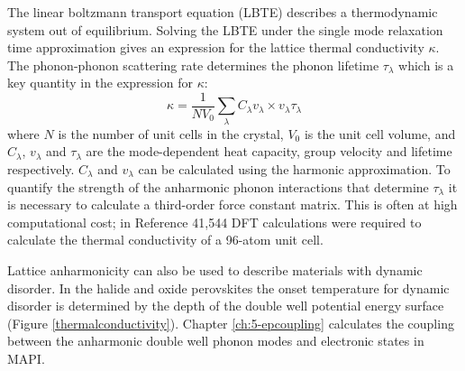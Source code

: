 The linear boltzmann transport equation (LBTE) describes a thermodynamic system out of equilibrium. Solving the LBTE under the single mode relaxation time approximation gives an expression for the lattice thermal conductivity $\kappa$. %
The phonon-phonon scattering rate determines the phonon lifetime $\tau_\lambda$ which is a key quantity in the expression for $\kappa$:
\begin{equation}
    \label{thermalconductivity}
    \kappa=\frac{1}{NV_0}\sum_\lambda C_\lambda v_\lambda \times v_\lambda \tau_\lambda
\end{equation}
where $N$ is the number of unit cells in the crystal, $V_0$ is the unit cell volume, and $C_\lambda$, $v_\lambda$ and $\tau_\lambda$ are the mode-dependent heat capacity, group velocity and lifetime respectively. $C_\lambda$ and $v_\lambda$ can be calculated using the harmonic approximation. To quantify the strength of the anharmonic phonon interactions that determine $\tau_\lambda$ it is necessary to calculate a third-order force constant matrix. This is often at high computational cost; in Reference \cite{Whalley2016} 41,544 DFT calculations were required to calculate the thermal conductivity of a 96-atom unit cell.

Lattice anharmonicity can also be used to describe materials with dynamic disorder. In the halide and oxide perovskites the onset temperature for dynamic disorder is determined by the depth of the double well potential energy surface (Figure \ref{thermalconductivity}).\autocite{Yang2017}
Chapter \ref{ch:5-epcoupling} calculates the coupling between the anharmonic double well phonon modes and electronic states in MAPI.


